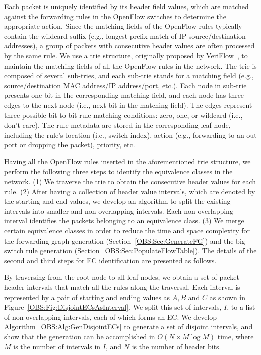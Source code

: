 Each packet is uniquely identified by its header field values, which are matched against the forwarding rules in the OpenFlow switches
to determine the appropriate action.
Since the matching fields of the OpenFlow rules typically contain the wildcard suffix (e.g., longest prefix match of IP source/destination addresses), a group of packets with consecutive header values are often processed by the same rule.
We use a trie structure, originally proposed by VeriFlow~\cite{Veriflow}, to maintain the matching fields of all the OpenFlow rules in the network.
The trie is composed of several sub-tries, and each sub-trie stands for a matching field (e.g., source/destination MAC address/IP address/port, etc.).
Each node in sub-trie presents one bit in the corresponding matching field, and each node has three edges to the next node (i.e., next bit in the  matching field).
The edges represent three possible bit-to-bit rule matching conditions: zero, one, or wildcard (i.e., don't care).
The rule metadata are stored in the corresponding leaf node, including the rule's location (i.e., switch index),
action (e.g., forwarding to an out port or dropping the packet), priority, etc.

Having all the OpenFlow rules inserted in the aforementioned trie structure,
we perform the following three steps to identify the equivalence classes in the network.
(1) We traverse the trie to obtain the consecutive header values for each rule.
(2) After having a collection of header value intervals, which are denoted by the starting and end values,
we develop an algorithm to split the existing intervals into smaller and non-overlapping intervals.
Each non-overlapping interval identifies the packets belonging to an equivalence class.
(3) We merge certain equivalence classes in order to reduce the time and space complexity for the forwarding graph generation
(Section~\ref{OBS:Sec:GenerateFG}) and the big-switch rule generation (Section~\ref{OBS:Sec:PopulateFlowTable}).
The details of the second and third steps for EC identification are presented as follows.

By traversing from the root node to all leaf nodes, we obtain a set of packet header intervals that match all the rules along the traversal.
Each interval is represented by a pair of starting and ending values as $A, B$ and $C$ as shown in Figure~\ref{OBS:Fig:DisjointECsAsInterval}.
We split this set of intervals, $I$, to a list of non-overlapping intervals, each of which forms an EC.
We develop Algorithm~\ref{OBS:Alg:GenDisjointECs} to generate a set of disjoint intervals, and show that the generation can be
accomplished in $O(N \times M\log M)$ time,
where $M$ is the number of intervals in $I$, and $N$ is the number of header bits.

